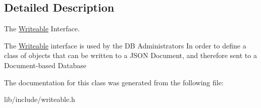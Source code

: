\subsection{Detailed Description}
The \hyperlink{classWriteable}{Writeable} Interface. 

The \hyperlink{classWriteable}{Writeable} interface is used by the D\-B Administrators In order to define a class of objects that can be written to a J\-S\-O\-N Document, and therefore sent to a Document-\/based Database 

The documentation for this class was generated from the following file\-:\begin{DoxyCompactItemize}
\item 
lib/include/writeable.\-h\end{DoxyCompactItemize}
